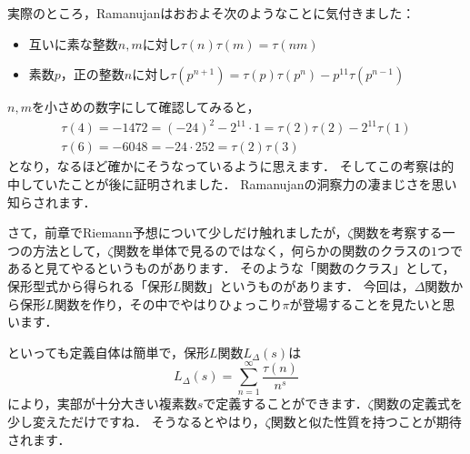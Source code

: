 実際のところ，Ramanujanはおおよそ次のようなことに気付きました：
\begin{itemize}
	\item 互いに素な整数$n,m$に対し$\tau(n)\tau(m)=\tau(nm)$
	\item 素数$p$，正の整数$n$に対し$\tau(p^{n+1})=\tau(p) \tau(p^{n})-p^{11}\tau(p^{n-1})$
\end{itemize}
$n,m$を小さめの数字にして確認してみると，
\begin{gather*}
	\tau(4)=-1472=(-24)^2-2^{11} \cdot 1=\tau(2)\tau(2)-2^{11}\tau(1) \\
	\tau(6)=-6048=-24 \cdot 252 = \tau(2) \tau(3)
\end{gather*}
となり，なるほど確かにそうなっているように思えます．
そしてこの考察は的中していたことが後に証明されました．
Ramanujanの洞察力の凄まじさを思い知らされます．

さて，前章でRiemann予想について少しだけ触れましたが，$\zeta$関数を考察する一つの方法として，$\zeta$関数を単体で見るのではなく，何らかの関数のクラスの$1$つであると見てやるというものがあります．
そのような「関数のクラス」として，保形型式から得られる「保形$L$関数」というものがあります．
今回は，$\Delta$関数から保形$L$関数を作り，その中でやはりひょっこり$\pi$が登場することを見たいと思います．

といっても定義自体は簡単で，保形$L$関数$L_{\Delta}(s)$は
\[
	L_{\Delta}(s)=\sum_{n=1}^{\infty}\frac {\tau (n)}{n^s}
\]
により，実部が十分大きい複素数$s$で定義することができます．$\zeta$関数の定義式を少し変えただけですね．
そうなるとやはり，$\zeta$関数と似た性質を持つことが期待されます．


